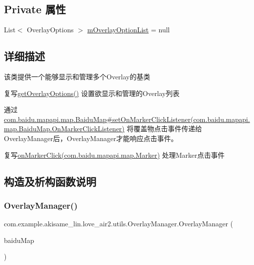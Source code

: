 \subsection*{Private 属性}
\begin{DoxyCompactItemize}
\item 
List$<$ Overlay\+Options $>$ \mbox{\hyperlink{classcom_1_1example_1_1akisame__lin_1_1love__air2_1_1utils_1_1_overlay_manager_aac09ca5b2da703be8945dd3378bd8462}{m\+Overlay\+Option\+List}} = null
\end{DoxyCompactItemize}


\subsection{详细描述}
该类提供一个能够显示和管理多个\+Overlay的基类 

复写\mbox{\hyperlink{classcom_1_1example_1_1akisame__lin_1_1love__air2_1_1utils_1_1_overlay_manager_ab43fa6415de888d480d913d1b924b309}{get\+Overlay\+Options()}} 设置欲显示和管理的\+Overlay列表 

通过 \mbox{\hyperlink{}{com.\+baidu.\+mapapi.\+map.\+Baidu\+Map\#set\+On\+Marker\+Click\+Listener(com.\+baidu.\+mapapi.\+map.\+Baidu\+Map.\+On\+Marker\+Click\+Listener)}} 将覆盖物点击事件传递给\+Overlay\+Manager后，\+Overlay\+Manager才能响应点击事件。 

复写\mbox{\hyperlink{}{on\+Marker\+Click(com.\+baidu.\+mapapi.\+map.\+Marker)}} 处理\+Marker点击事件 

\subsection{构造及析构函数说明}
\mbox{\label{classcom_1_1example_1_1akisame__lin_1_1love__air2_1_1utils_1_1_overlay_manager_ad74ec83ee7b547fb38569b0d8502b390}} 
\subsubsection{\texorpdfstring{OverlayManager()}{OverlayManager()}}
{\footnotesize\ttfamily com.\+example.\+akisame\+\_\+lin.\+love\+\_\+air2.\+utils.\+Overlay\+Manager.\+Overlay\+Manager (\begin{DoxyParamCaption}\item[{Baidu\+Map}]{baidu\+Map }\end{DoxyParamCaption})\hspace{0.3cm}{\ttfamily [inline]}}

